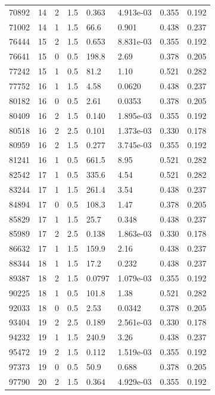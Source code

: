 \documentclass[preview]{standalone}
\begin{document}
{{{\begin{tabular}{L{1.2cm}C{1.2cm} C{0.3cm}C{0.5cm} C{1.4cm}C{1.4cm} C{1.4cm}C{1.4cm}}
  70892  &    14  & 2     & 1.5 &  0.363  & 4.913e-03  & 0.355 &  0.192   \\ 
  71002  &    14  & 1     & 1.5 &  66.6  & 0.901  & 0.438 &  0.237   \\ 
  76444  &    15  & 2     & 1.5 &  0.653  & 8.831e-03  & 0.355 &  0.192   \\ 
  76641  &    15  & 0     & 0.5 &  198.8  & 2.69  & 0.378 &  0.205   \\ 
  77242  &    15  & 1     & 0.5 &  81.2  & 1.10  & 0.521 &  0.282   \\ 
  77752  &    16  & 1     & 1.5 &  4.58  & 0.0620  & 0.438 &  0.237   \\ 
  80182  &    16  & 0     & 0.5 &  2.61  & 0.0353  & 0.378 &  0.205   \\ 
  80409  &    16  & 2     & 1.5 &  0.140  & 1.895e-03  & 0.355 &  0.192   \\ 
  80518  &    16  & 2     & 2.5 &  0.101  & 1.373e-03  & 0.330 &  0.178   \\ 
  80959  &    16  & 2     & 1.5 &  0.277  & 3.745e-03  & 0.355 &  0.192   \\ 
  81241  &    16  & 1     & 0.5 &  661.5  & 8.95  & 0.521 &  0.282   \\ 
  82542  &    17  & 1     & 0.5 &  335.6  & 4.54  & 0.521 &  0.282   \\ 
  83244  &    17  & 1     & 1.5 &  261.4  & 3.54  & 0.438 &  0.237   \\ 
  84894  &    17  & 0     & 0.5 &  108.3  & 1.47  & 0.378 &  0.205   \\ 
  85829  &    17  & 1     & 1.5 &  25.7  & 0.348  & 0.438 &  0.237   \\ 
  85989  &    17  & 2     & 2.5 &  0.138  & 1.863e-03  & 0.330 &  0.178   \\ 
  86632  &    17  & 1     & 1.5 &  159.9  & 2.16  & 0.438 &  0.237   \\ 
  88344  &    18  & 1     & 1.5 &  17.2  & 0.232  & 0.438 &  0.237   \\ 
  89387  &    18  & 2     & 1.5 &  0.0797  & 1.079e-03  & 0.355 &  0.192   \\ 
  90225  &    18  & 1     & 0.5 &  101.8  & 1.38  & 0.521 &  0.282   \\ 
  92033  &    18  & 0     & 0.5 &  2.53  & 0.0342  & 0.378 &  0.205   \\ 
  93404  &    19  & 2     & 2.5 &  0.189  & 2.561e-03  & 0.330 &  0.178   \\ 
  94232  &    19  & 1     & 1.5 &  240.9  & 3.26  & 0.438 &  0.237   \\ 
  95472  &    19  & 2     & 1.5 &  0.112  & 1.519e-03  & 0.355 &  0.192   \\ 
  97373  &    19  & 0     & 0.5 &  50.9  & 0.688  & 0.378 &  0.205   \\ 
  97790  &    20  & 2     & 1.5 &  0.364  & 4.929e-03  & 0.355 &  0.192   \\ 
\hline 
\end{tabular} 

}}}
\end{document}
